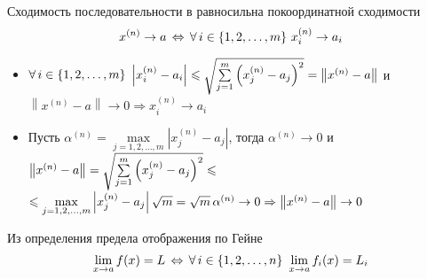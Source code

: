\begin{utv}[https://www.youtube.com/live/46TKmI9S1Nw?si=NM7QKNlkedLtg16C&t=6749]
	Сходимость последовательности в {\small\rmm} равносильна покоординатной сходимости
	\[x^{(n)} \to a \, \Leftrightarrow \, \forall \, i \in \{1, 2, \dots, m\}\ x^{(n)}_i \to a_i\]
\end{utv} %

\begin{prf} %
	\begin{itemize}
		\item[\rproof] {\small $\forall \, i \in \{1, 2, \dots, m\}$} 
		$\left|x^{(n)}_i - a_i\right| \leqslant \sqrt{\sum\limits_{j=1}^m \left(x^{(n)}_j - a_j\right)^2}
		= \left\|x^{(n)} - a\right\|$ и $\left\|x^{(n)} - a\right\| \to 0 
		\Rightarrow x^{(n)}_i \to a_i$
		
		\item[\lproof] Пусть $\alpha^{(n)} =\max\limits_{j=1, 2, \dots, m} \left|x_j^{(n)} - a_j\right|$, 
		тогда $\alpha^{(n)} \to 0$
		и $\left\|x^{(n)} - a\right\| 
		= \sqrt{\sum\limits_{j=1}^m \left(x^{(n)}_j - a_j\right)^2} 
		\leqslant$\linebreak$\leqslant \max\limits_{j=1, 2, \dots, m} \left|x_j^{(n)} - a_j\right| \sqrt{m} 
		= \sqrt{m}\, \alpha^{(n)} \to 0 
		\Rightarrow \left\|x^{(n)} - a\right\| \to 0$ 
	\end{itemize}
\end{prf} %

\begin{slv}[https://www.youtube.com/live/46TKmI9S1Nw?si=ijDDMXWDNAVdX70b&t=7070] %
	Из определения предела отображения по Гейне 
	\[\lim_{x \to a}f(x) = L\, \Leftrightarrow \, \forall \, i \in \{1, 2, \dots, n\}\ \lim_{x \to a}f_i(x) = L_i\]
\end{slv} %

\pagebreak

